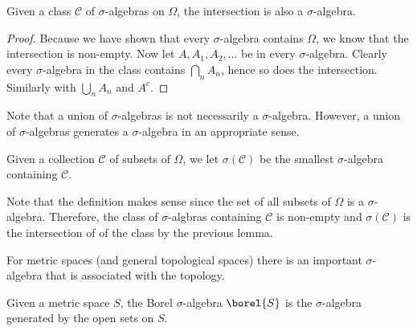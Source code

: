 \begin{lem}Given a class $\mathcal{C}$ of $\sigma$-algebras on
  $\Omega$, the intersection is also a $\sigma$-algebra.
\end{lem}
\begin{proof}
Because we have shown that every $\sigma$-algebra contains $\Omega$,
we know that the intersection is non-empty.  Now let $A, A_1, A_2, \dots$
be in every $\sigma$-algebra.  Clearly every $\sigma$-algebra in the
class contains $\bigcap_n A_n$, hence so does the intersection.
Similarly with $\bigcup_n A_n$ and $A^c$.
\end{proof}
Note that a union of $\sigma$-algebras is not necessarily a
$\sigma$-algebra.  However, a union of $\sigma$-algebras generates a
$\sigma$-algebra in an appropriate sense.
\begin{defn}Given a collection $\mathcal{C}$ of subsets of $\Omega$,
  we let $\sigma(\mathcal{C})$ be the smallest $\sigma$-algebra
  containing $\mathcal{C}$.
\end{defn}
Note that the definition makes sense since the set of all subsets of
$\Omega$ is a $\sigma$-algebra.  Therefore, the class of
$\sigma$-algbras containing $\mathcal{C}$ is non-empty and
$\sigma(\mathcal{C})$ is the intersection of of the class by the
previous lemma.

For metric spaces (and general topological spaces) there is an
important $\sigma$-algebra that is associated with the topology.
\begin{defn}Given a metric space $S$, the Borel $\sigma$-algebra
  $\borel{S}$ is the $\sigma$-algebra generated by the open sets on $S$.
\end{defn}

